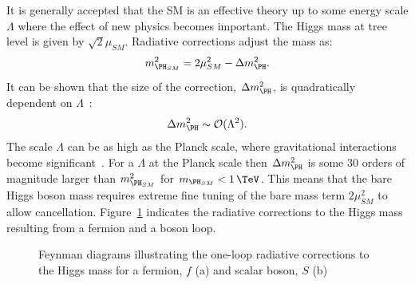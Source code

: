 It is generally accepted that the \ac{SM} is an effective theory up to some
energy scale $\Lambda$ where the effect of new physics becomes important. 
The Higgs mass at tree level is given by $\sqrt{2}\mu_{SM}$. Radiative
corrections adjust the mass as:
\begin{equation}
m_{\PH_{SM}}^{2} = 2\mu_{SM}^{2} - \Delta m_{\PH}^{2}. 
\end{equation}
It can be shown that the size of the correction, $\Delta m_{\PH}^{2}$, is
quadratically dependent on $\Lambda$~\cite{Carena:2002es}:
\begin{equation}
\Delta m_{\PH}^{2} \sim \mathcal{O}(\Lambda^{2}).
\end{equation}
The scale $\Lambda$ can be as high as the Planck scale, where gravitational
interactions become significant~\cite{Griffiths:2008nx}. For a $\Lambda$ at the Planck scale then
$\Delta m_{\PH}^{2}$ is some 30 orders of magnitude larger than 
$m_{\PH_{SM}}^{2}$ for $m_{\PH_{SM}}<1\,\TeV$. This means that the bare Higgs
boson mass requires extreme fine tuning of the bare mass term $2\mu_{SM}^{2}$ to
allow cancellation. Figure~\ref{fig:HiggsMassLoops} indicates the radiative
corrections to the Higgs mass resulting from a fermion and a boson loop.

\begin{figure}[htbp]
\caption{Feynman diagrams illustrating the one-loop radiative corrections to the Higgs
mass for a fermion, $f$ (a) and scalar boson, $S$ (b)}
\label{fig:HiggsMassLoops}
\end{figure}

